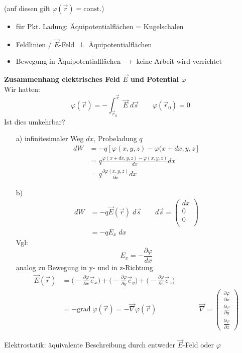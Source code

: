 \documentclass[titlepage,12pt,a4paper,ngerman]{report}
\newcommand{\tx}[1]{\textrm{#1}}
\newcommand{\const}{\tx{const.}}
\begin{document}
\begin{itemize}
(auf diesen gilt $\varphi(\vec{r}) = \const$)
\begin{itemize}
\item für Pkt. Ladung: Äquipotentialflächen = Kugelschalen
\item Feldlinien / $\vec{E}$-Feld $\perp$ Äquipotentialflächen
\item Bewegung in Äquipotentialflächen $\rightarrow$ keine Arbeit wird verrichtet
\end{itemize}
\textbf{Zusammenhang elektrisches Feld $\vec{E}$ und Potential $\varphi$}\\
Wir hatten: $$\varphi(\vec{r}) = - \int_{\vec{r}_0}^{\vec{r}} \vec{E} \; d \vec{s} \qquad \varphi(\vec{r}_0) = 0$$
Ist dies umkehrbar?
\begin{itemize}
\item[a)] infinitesimaler Weg $dx$, Probeladung $q$
\begin{align*}
dW &= -q [ \varphi(x,y,z) - \varphi(x + dx,y,z] \\[10pt]
&= q \frac{\varphi(x+dx,y,z) - \varphi(x,y,z)}{dx} dx \\[10pt]
& = q \frac{\partial \varphi(x,y,z)}{\partial x} dx
\end{align*}
\item[b)]
\begin{align*}
dW &= -q \vec{E}(\vec{r}) \; d\vec{s} \qquad d\vec{s} = \begin{pmatrix}
dx\\
0\\
0\\
\end{pmatrix}\\
&= -q E_x\;dx
\end{align*}
Vgl: $$E_x = -\frac{\partial \varphi}{dx}$$
analog zu Bewegung in y- und in z-Richtung
\begin{align*}
\vec{E} (\vec{r}) &=  \bigg( - \frac{\partial \varphi}{\partial x} \vec{e}_x \bigg) + \bigg( - \frac{\partial \varphi}{\partial y} \vec{e}_y \bigg) + \bigg( - \frac{\partial \varphi}{\partial z} \vec{e}_z \bigg)\\[10pt]
&= -\textrm{grad}\; \varphi(\vec{r}) = - \vec{\nabla} \varphi(\vec{r}) \qquad \qquad \qquad \vec{\nabla} = \begin{pmatrix}
\frac{\partial \varphi}{\partial x} \\
\frac{\partial \varphi}{\partial y} \\
\frac{\partial \varphi}{\partial z} 
\end{pmatrix}
\end{align*}
\end{itemize} 
Elektrostatik: äquivalente Beschreibung durch entweder $\vec{E}$-Feld oder $\varphi$\\
\end{itemize}
\end{document}

